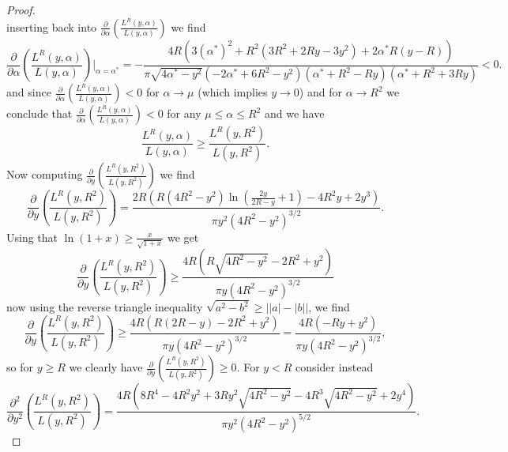 \documentclass[a4paper,11pt]{article}
\newcommand{\abs}[1]{\left\lvert #1 \right\rvert}
\numberwithin{equation}{section}
\begin{document}
\begin{proof}
\begin{equation}
		\end{equation}
		inserting back into $ \frac{\partial}{\partial \alpha}\left(\frac{L^R(y,\alpha)}{L(y,\alpha)}\right) $ we find \begin{equation}
		 \frac{\partial}{\partial \alpha}\left(\frac{L^R(y,\alpha)}{L(y,\alpha)}\right)\rvert_{\alpha=\alpha^*}=-\frac{4 R \left(3 (\alpha^*)^2+R^2 \left(3 R^2+2 R y-3 y^2\right)+2 \alpha^*  R (y-R)\right)}{\pi  \sqrt{4 \alpha^* -y^2} \left(-2 \alpha^* +6 R^2-y^2\right) \left(\alpha^* +R^2-R y\right) \left(\alpha^* +R^2+3 R y\right)}<0.
		\end{equation}
		and since $ \frac{\partial}{\partial \alpha}\left(\frac{L^R(y,\alpha)}{L(y,\alpha)}\right)<0 $ for $ \alpha\to \mu $ (which implies $ y\to 0 $) and for $ \alpha\to R^2 $ we conclude that $ \frac{\partial}{\partial \alpha}\left(\frac{L^R(y,\alpha)}{L(y,\alpha)}\right)<0 $ for any $ \mu\leq\alpha\leq R^2 $ and we have \begin{equation}
		\frac{L^R(y,\alpha)}{L(y,\alpha)}\geq\frac{L^R(y,R^2)}{L(y,R^2)}.
		\end{equation}
		Now computing $ \frac{\partial}{\partial y}\left(\frac{L^R(y,R^2)}{L(y,R^2)}\right) $ we find \begin{equation}
		\frac{\partial}{\partial y}\left(\frac{L^R(y,R^2)}{L(y,R^2)}\right)=\frac{2 R \left(R \left(4 R^2-y^2\right) \ln \left(\frac{2 y}{2 R-y}+1\right)-4 R^2 y+2 y^3\right)}{\pi  y^2 \left(4 R^2-y^2\right)^{3/2}}.
		\end{equation}
		Using that $ \ln(1+x)\geq \frac{x}{\sqrt{{1+x}}} $ we get \begin{equation}
		\frac{\partial}{\partial y}\left(\frac{L^R(y,R^2)}{L(y,R^2)}\right)\geq\frac{4 R \left(R \sqrt{4 R^2-y^2}-2 R^2+y^2\right)}{\pi  y \left(4 R^2-y^2\right)^{3/2}}
		\end{equation}
		now using the reverse triangle inequality $ \sqrt{a^2-b^2}\geq\abs{\abs{a}-\abs{b}} $, we find \begin{equation}
		\frac{\partial}{\partial y}\left(\frac{L^R(y,R^2)}{L(y,R^2)}\right)\geq\frac{4 R \left(R (2 R-y)-2 R^2+y^2\right)}{\pi  y \left(4 R^2-y^2\right)^{3/2}}=\frac{4 R \left(-R y+y^2\right)}{\pi  y \left(4 R^2-y^2\right)^{3/2}},
		\end{equation}
		so for $ y\geq R $ we clearly have $ \frac{\partial}{\partial y}\left(\frac{L^R(y,R^2)}{L(y,R^2)}\right)\geq0 $. For $ y<R $ consider instead\begin{equation}
		\frac{\partial^2}{\partial y^2}\left(\frac{L^R(y,R^2)}{L(y,R^2)}\right)=\frac{4 R \left(8 R^4-4 R^2 y^2+3 R y^2 \sqrt{4 R^2-y^2}-4 R^3 \sqrt{4 R^2-y^2}+2 y^4\right)}{\pi  y^2 \left(4 R^2-y^2\right)^{5/2}}.

\end{equation}
\end{proof}
\end{document}
